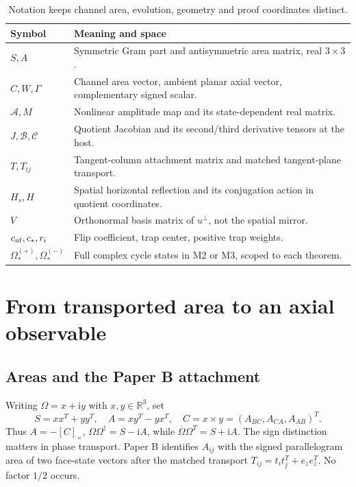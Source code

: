 \documentclass[11pt,a4paper]{article}
\newcommand{\R}{\mathbb R}\newcommand{\C}{\mathbb C}\newcommand{\Om}{\Omega}\newcommand{\Fh}{\widehat F}\newcommand{\cof}{\operatorname{cof}}\newcommand{\diag}{\operatorname{diag}}\newcommand{\Argz}{\operatorname{Arg}_0}\newcommand{\iu}{\mathrm i}\newcommand{\dd}{\mathrm d}
\begin{document}
\begin{table}[ht]
\centering\small
\begin{tabular}{p{.19\linewidth}p{.74\linewidth}}\toprule
Symbol & Meaning and space\\\midrule
$S,A$ & Symmetric Gram part and antisymmetric area matrix, real $3\times3$.\\
$C,W,\Gamma$ & Channel area vector, ambient planar axial vector, complementary signed scalar.\\
$\mathcal A,M$ & Nonlinear amplitude map and its state-dependent real matrix.\\
$J,\mathcal B,\mathcal C$ & Quotient Jacobian and its second/third derivative tensors at the host.\\
$T,T_{ij}$ & Tangent-column attachment matrix and matched tangent-plane transport.\\
$H_s,H$ & Spatial horizontal reflection and its conjugation action in quotient coordinates.\\
$V$ & Orthonormal basis matrix of $u^\perp$, not the spatial mirror.\\
$c_{\rm nf},c_*,r_i$ & Flip coefficient, trap center, positive trap weights.\\
$\Om_*^{(+)},\Om_*^{(-)}$ & Full complex cycle states in M2 or M3, scoped to each theorem.\\\bottomrule
\end{tabular}
\caption{Notation keeps channel area, evolution, geometry and proof coordinates distinct.}
\end{table}

\section{From transported area to an axial observable}
\subsection{Areas and the Paper B attachment}
Writing $\Om=x+\iu y$ with $x,y\in\R^3$, set
\begin{equation}
 S=xx^T+yy^T,\quad A=xy^T-yx^T,\quad
 C=x\times y=(A_{BC},A_{CA},A_{AB})^T.\label{eq:SA}
\end{equation}
Thus $A=-[C]_\times$, $\Om\Om^\dagger=S-\iu A$, while $\overline\Om\Om^T=S+\iu A$. The sign distinction matters in phase transport. Paper B identifies $A_{ij}$ with the signed parallelogram area of two face-state vectors after the matched transport $T_{ij}=t_it_j^T+e_ze_z^T$. No factor $1/2$ occurs.
\end{document}
